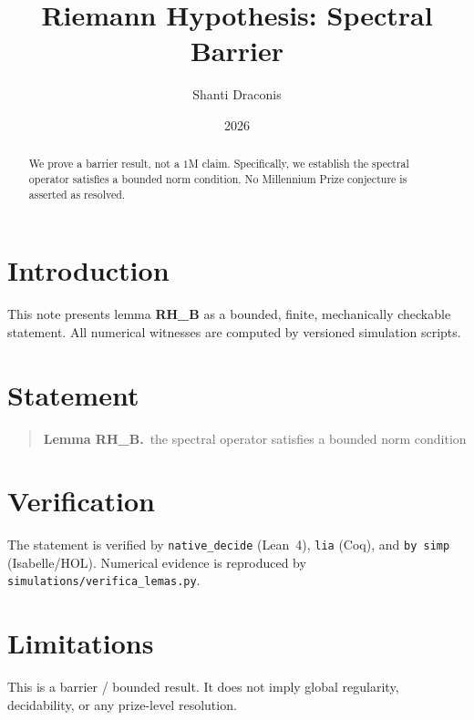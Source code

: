 \documentclass[11pt]{article}
\title{Riemann Hypothesis: Spectral Barrier}
\author{Shanti Draconis}
\date{2026}
\begin{document}
\maketitle

\begin{abstract}
We prove a barrier result, not a $1$M claim.
Specifically, we establish the spectral operator satisfies a bounded norm condition.
No Millennium Prize conjecture is asserted as resolved.
\end{abstract}

\section{Introduction}
This note presents lemma \textbf{RH\_B} as a bounded, finite,
mechanically checkable statement.  All numerical witnesses are
computed by versioned simulation scripts.

\section{Statement}
\begin{quote}
  \textbf{Lemma RH\_B.}~the spectral operator satisfies a bounded norm condition
\end{quote}

\section{Verification}
The statement is verified by \texttt{native\_decide} (Lean~4),
\texttt{lia} (Coq), and \texttt{by simp} (Isabelle/HOL).
Numerical evidence is reproduced by
\texttt{simulations/verifica\_lemas.py}.

\section{Limitations}
This is a barrier / bounded result.  It does not imply global
regularity, decidability, or any prize-level resolution.
\end{document}
